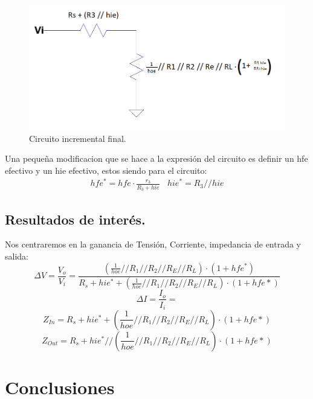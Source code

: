 \documentclass[a4paper]{article}
\begin{document}
\begin{figure} [H]
	\centering
	\includegraphics[width=\textwidth]{imagenes/circinc2.png}
	\caption{Circuito incremental final.}
	\label{fig:circinc2}
\end{figure}
Una pequeña modificacion que se hace a la expresión del circuito es definir un hfe efectivo y un hie efectivo, estos siendo para el circuito:
\begin{align} hfe^* = hfe\cdot \frac{r_3}{R_3+hie} \ \ \ \ hie^* = R_3 // hie \end{align}
\subsection{Resultados de interés.}
Nos centraremos en la ganancia de Tensión, Corriente, impedancia de entrada y salida:
\begin{equation} \Delta V = \frac{V_o}{V_i} = \frac{ \left(\frac{1}{hoe} // R_1 // R_2 // R_E // R_L  \right)\cdot (1+hfe^*)}{R_s + hie^* + \left(\frac{1}{hoe} // R_1 // R_2 // R_E // R_L  \right)\cdot (1+hfe*) } 
\end{equation}
\begin{equation} \Delta I = \frac{I_o}{I_i} =  
\end{equation}
\begin{equation} Z_{In} = R_s + hie^* + \left(\frac{1}{hoe} // R_1 // R_2 // R_E // R_L  \right)\cdot (1+hfe*)\end{equation}
\begin{equation} Z_{Out} = R_s + hie^* //  \left(\frac{1}{hoe} // R_1 // R_2 // R_E // R_L  \right)\cdot (1+hfe*)\end{equation}
\section{Conclusiones}
\end{document}
